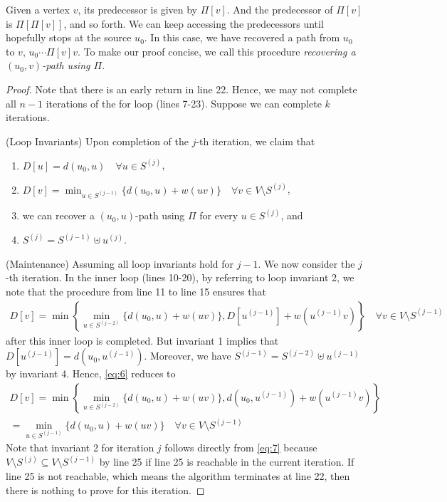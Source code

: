 \documentclass[thmcnt=section, 12pt, color=cyan]{my-elegantbook}
\begin{document}
Given a vertex $v$, its predecessor is given by $\Pi[v]$. And the predecessor of $\Pi[v]$ is $\Pi[ \Pi[v] ]$, and so forth. We can keep accessing the predecessors until hopefully stops at the source $u_0$. In this case, we have recovered a path from $u_0$ to $v$, $u_0 \cdots \Pi[v] v$. To make our proof concise, we call this procedure \textit{recovering a $(u_0, v)$-path using $\Pi$}.

\begin{proof}
    Note that there is an early return in line 22. Hence, we may not complete all $n-1$ iterations of the for loop (lines 7-23). Suppose we can complete $k$ iterations. 

    (Loop Invariants) Upon completion of the $j$-th iteration, we claim that 
    \begin{enumerate}
        \item $D[u] = d(u_0, u) \quad \forall u \in S^{(j)}$,
        \item $D[v] = \min_{u \in S^{(j-1)}} \{ d(u_0, u) + w(u v) \} \quad \forall v \in V \setminus S^{(j)}$,
        \item we can recover a $(u_0, u)$-path using $\Pi$ for every $u \in S^{(j)}$, and 
        \item $S^{(j)} = S^{(j-1)} \uplus u^{(j)}$. 
    \end{enumerate}

    (Maintenance) Assuming all loop invariants hold for $j-1$. We now consider the $j$-th iteration. In the inner loop (lines 10-20), by referring to loop invariant 2, we note that the procedure from line 11 to line 15 ensures that 
    \begin{align}
        D[v] = \min \left\{
            \min_{u \in S^{(j-2)}} \{ d(u_0, u) + w(u v) \},
            D[u^{(j-1)}] + w(u^{(j-1)} v)
        \right\}
        \quad \forall v \in V \setminus S^{(j-1)}
        \label{eq:6}
    \end{align}
    after this inner loop is completed. But invariant 1 implies that $D[u^{(j-1)}] = d(u_0, u^{(j-1)})$. Moreover, we have $S^{(j-1)} = S^{(j-2)} \uplus u^{(j-1)}$ by invariant 4. Hence, \eqref{eq:6} reduces to 
    \begin{multline}
        D[v] = \min \left\{
            \min_{u \in S^{(j-2)}} \{ d(u_0, u) + w(u v) \},
            d(u_0, u^{(j-1)}) + w(u^{(j-1)} v)
        \right\} \\
        = \min_{u \in S^{(j-1)}} \{ d(u_0, u) + w(u v) \}
        \quad \forall v \in V \setminus S^{(j-1)}
        \label{eq:7}
    \end{multline}
    Note that invariant 2 for iteration $j$ follows directly from \eqref{eq:7} because $V \setminus S^{(j)} \subseteq V \setminus S^{(j-1)}$ by line 25 if line 25 is reachable in the current iteration. If line 25 is not reachable, which means the algorithm terminates at line 22, then there is nothing to prove for this iteration.


\end{proof}
\end{document}
